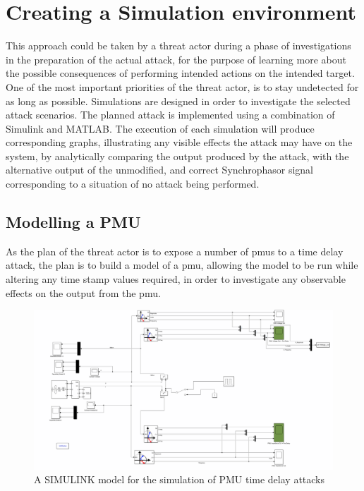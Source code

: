 \section{Creating a Simulation environment}

This approach could be taken by a threat actor during a phase of investigations in the preparation of the actual attack, for the purpose of learning more about the possible consequences of performing intended actions on the intended target. One of the most important priorities of the threat actor, is to stay undetected for as long as possible. Simulations are designed in order to investigate the selected attack scenarios. The planned attack is implemented using a combination of Simulink and MATLAB. The execution of each simulation will produce corresponding graphs, illustrating any visible effects the attack may have on the system, by analytically comparing the output produced by the attack, with the alternative output of the unmodified, and correct Synchrophasor signal corresponding to  a situation of no attack being performed.

\subsection{Modelling a PMU}

As the plan of the threat actor is to expose  a number of \acrshort{pmu}s to a time  delay attack, the plan is to build a model of a \acrshort{pmu}, allowing the model to be run while altering any time stamp values required, in order to investigate any observable effects on the output from the \acrshort{pmu}.
 \begin{figure}[ht]
\centering
\includegraphics[width=\textwidth]{figures/SimPMU.png}
\caption[PmuSIM SIMULINK model]{A SIMULINK model for the simulation of PMU time delay attacks}

\end{figure}



